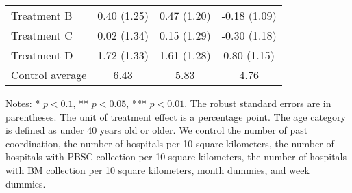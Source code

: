 \documentclass[12pt, a4paper]{article}
\begin{document}
\begin{table}[H]
\begin{threeparttable}
\begin{tabular}[t]{lccc}
\hspace{1em}Treatment B & 0.40 (1.25) & 0.47 (1.20) & -0.18 (1.09)\\
\hspace{1em}Treatment C & 0.02 (1.34) & 0.15 (1.29) & -0.30 (1.18)\\
\hspace{1em}Treatment D & 1.72 (1.33) & 1.61 (1.28) & 0.80 (1.15)\\
\hspace{1em}Control average & 6.43 & 5.83 & 4.76\\
\bottomrule
\end{tabular}
\begin{tablenotes}
\item Notes: * $p < 0.1$, ** $p < 0.05$, *** $p < 0.01$. The robust standard errors are in parentheses. The unit of treatment effect is a percentage point. The age category is defined as under 40 years old or older. We control the number of past coordination, the number of hospitals per 10 square kilometers, the number of hospitals with PBSC collection per 10 square kilometers, the number of hospitals with BM collection per 10 square kilometers, month dummies, and week dummies.
\end{tablenotes}
\end{threeparttable}
\end{table}

\clearpage


\end{document}
